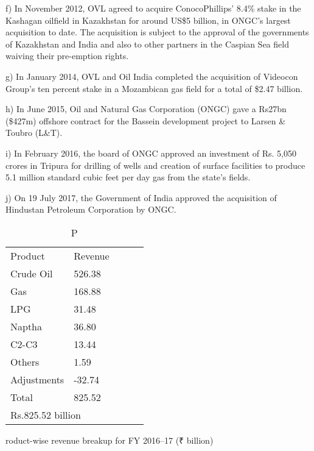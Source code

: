 f) In November 2012, OVL agreed to acquire ConocoPhillips' 8.4\% stake in the Kashagan oilfield in Kazakhstan for around US\$5 billion, in ONGC's largest acquisition to date. The acquisition is subject to the approval of the governments of Kazakhstan and India and also to other partners in the Caspian Sea field waiving their pre-emption rights.

g) In January 2014, OVL and Oil India completed the acquisition of Videocon Group's ten percent stake in a Mozambican gas field for a total of \$2.47 billion.

h) In June 2015, Oil and Natural Gas Corporation (ONGC) gave a Rs27bn (\$427m) offshore contract for the Bassein development project to Larsen \& Toubro (L\&T).

i) In February 2016, the board of ONGC approved an investment of Rs. 5,050 crores in Tripura for drilling of wells and creation of surface facilities to produce 5.1 million standard cubic feet per day gas from the state's fields.

j) On 19 July 2017, the Government of India approved the acquisition of Hindustan Petroleum Corporation by ONGC.

 
 
\begin{table}[]
\begin{tabular}{|l|l|lll}
\cline{1-2}
Product              & Revenue          &  &  &  \\ \cline{1-2}
Crude Oil            & 526.38           &  &  &  \\ \cline{1-2}
Gas                  & 168.88           &  &  &  \\ \cline{1-2}
LPG                  & 31.48            &  &  &  \\ \cline{1-2}
Naptha               & 36.80            &  &  &  \\ \cline{1-2}
C2-C3                & 13.44            &  &  &  \\ \cline{1-2}
Others               & 1.59             &  &  &  \\ \cline{1-2}
Adjustments          & -32.74           &  &  &  \\ \cline{1-2}
Total                & 825.52           &  &  &  \\ \cline{1-2}
\multicolumn{2}{|l|}{Rs.825.52 billion} &  &  &  \\ \cline{1-2}
\end{tabular}

\caption Product-wise revenue breakup for FY 2016–17 (₹ billion)
\end{table}


